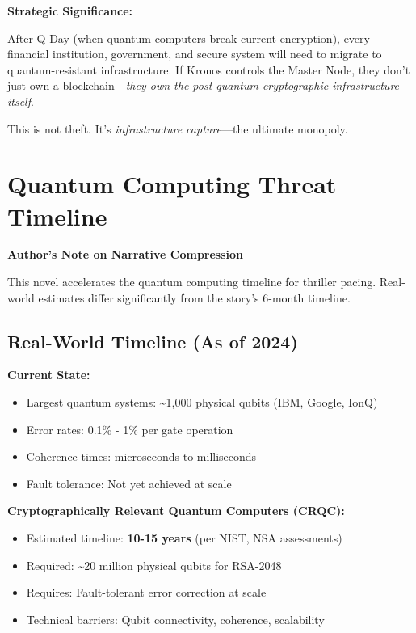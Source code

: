 \documentclass[12pt,oneside]{book}
\begin{document}
\textbf{Strategic Significance:}

After Q-Day (when quantum computers break current encryption), every financial institution, government, and secure system will need to migrate to quantum-resistant infrastructure. If Kronos controls the Master Node, they don't just own a blockchain—\textit{they own the post-quantum cryptographic infrastructure itself}.

This is not theft. It's \textit{infrastructure capture}—the ultimate monopoly.

\section{Quantum Computing Threat Timeline}

\begin{technote}
\textbf{Author's Note on Narrative Compression}

This novel accelerates the quantum computing timeline for thriller pacing. Real-world estimates differ significantly from the story's 6-month timeline.
\end{technote}

\subsection{Real-World Timeline (As of 2024)}

\textbf{Current State:}
\begin{itemize}
\item Largest quantum systems: \textasciitilde1,000 physical qubits (IBM, Google, IonQ)
\item Error rates: 0.1\% - 1\% per gate operation
\item Coherence times: microseconds to milliseconds
\item Fault tolerance: Not yet achieved at scale
\end{itemize}

\textbf{Cryptographically Relevant Quantum Computers (CRQC):}
\begin{itemize}
\item Estimated timeline: \textbf{10-15 years} (per NIST, NSA assessments)
\item Required: \textasciitilde20 million physical qubits for RSA-2048
\item Requires: Fault-tolerant error correction at scale
\item Technical barriers: Qubit connectivity, coherence, scalability
\end{itemize}
\end{document}
